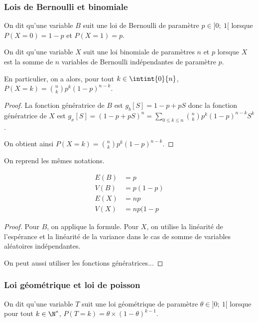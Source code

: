 \subsubsection{Lois de Bernoulli et binomiale}

\begin{de}
On dit qu'une variable $B$ suit une loi de Bernoulli de paramètre $p \in ]0;~1[$ lorsque $P(X=0)=1-p$ et $P(X=1)=p$.

On dit qu'une variable $X$ suit une loi binomiale de paramètres $n$ et $p$ lorsque $X$ est la somme de $n$ variables de Bernoulli indépendantes de paramètre $p$.

En particulier, on a alors, pour tout $k \in \intint{0}{n}$, $P(X=k) = {n \choose k} p^k(1-p)^{n-k}$.
\end{de}

\begin{proof}
La fonction génératrice de $B$ est $g_b[S] = 1-p+pS$ donc la fonction génératrice de $X$ est $g_x[S] = \left(1-p+pS\right)^n = \displaystyle{\sum \limits_{0 \leq k \leq n}} {n \choose k}p^k(1-p)^{n-k}S^k$.

On obtient ainsi $P(X=k) = {n \choose k}p^k(1-p)^{n-k}$.
\end{proof}


\begin{prop}
On reprend les mêmes notations.

\begin{align*}
E(B) & =p \\
V(B) & =p(1-p) \\
E(X) & =np \\
V(X) & = np(1-p
\end{align*}

\end{prop}

\begin{proof}
Pour $B$, on applique la formule. Pour $X$, on utilise la linéarité de l'espérance et la linéarité de la variance dans le cas de somme de variables aléatoires indépendantes.

On peut aussi utiliser les fonctions génératrices...
\end{proof}

\subsubsection{Loi géométrique et loi de poisson}

\begin{de}
On dit qu'une variable $T$ suit une loi géométrique de paramètre $\theta \in ]0;~1[$ lorsque pour tout $k \in \N^{*}$, $P(T=k) = \theta \times (1-\theta)^{k-1}$.
\end{de}

